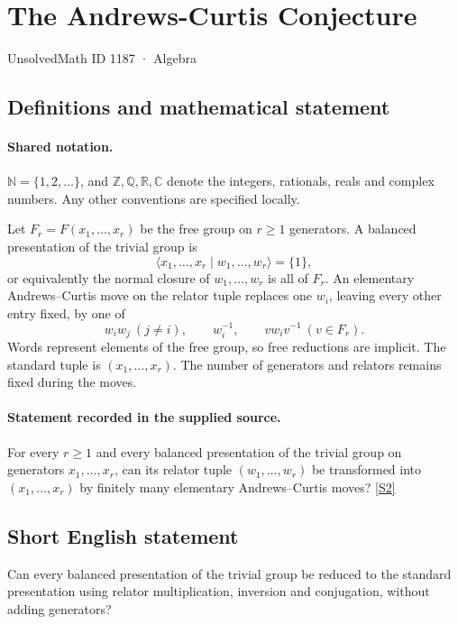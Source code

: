 \documentclass[11pt]{article}
\newcommand{\sref}[2]{\hyperlink{source:#1:#2}{[S#2]}}
\begin{document}
\setcounter{section}{1186}
\section{The Andrews-Curtis Conjecture}\label{1187}
{\small\sffamily UnsolvedMath ID 1187 · Algebra}
\subsection{Definitions and mathematical statement}

\paragraph{Shared notation.}$\mathbb N=\{1,2,\ldots\}$, and $\mathbb Z,\mathbb Q,\mathbb R,\mathbb C$ denote the integers, rationals, reals and complex numbers. Any other conventions are specified locally.


Let \(F_r=F(x_1,\ldots,x_r)\) be the free group on \(r\ge1\)
generators.  A balanced presentation of the trivial group is
\[
 \langle x_1,\ldots,x_r\mid w_1,\ldots,w_r\rangle=\{1\},
\]
or equivalently the normal closure of \(w_1,\ldots,w_r\) is all of
\(F_r\).  An elementary Andrews--Curtis move on the relator tuple
replaces one \(w_i\), leaving every other entry fixed, by one of
\[
 w_iw_j\ (j\ne i),\qquad w_i^{-1},\qquad
 v w_i v^{-1}\ (v\in F_r).
\]
Words represent elements of the free group, so free reductions are implicit.
The standard tuple is \((x_1,\ldots,x_r)\).
The number of generators and relators remains fixed during the moves.
\paragraph{Statement recorded in the supplied source.}
For every \(r\ge1\) and every balanced presentation of the trivial
group on generators \(x_1,\ldots,x_r\), can its relator tuple
\((w_1,\ldots,w_r)\) be transformed into
\((x_1,\ldots,x_r)\) by finitely many elementary
Andrews--Curtis moves? \sref{1187}{2}
\subsection{Short English statement}
Can every balanced presentation of the trivial group be reduced to the standard presentation using relator multiplication, inversion and conjugation, without adding generators?
\end{document}
